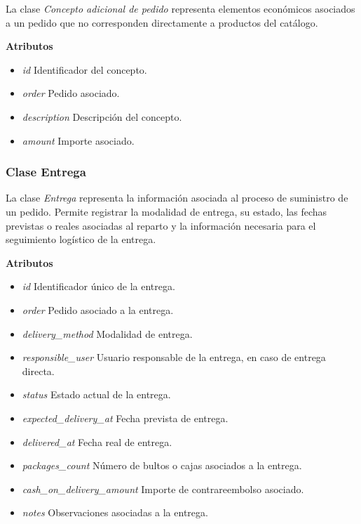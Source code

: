 La clase \textit{Concepto adicional de pedido} representa elementos económicos asociados a un pedido que no corresponden directamente a productos del catálogo.

\textbf{Atributos}

\begin{itemize}

      \item \textit{id}
            Identificador del concepto.
      \item \textit{order}
            Pedido asociado.
      \item \textit{description}
            Descripción del concepto.
      \item \textit{amount}
            Importe asociado.

\end{itemize}

\subsubsection{Clase Entrega}

La clase \textit{Entrega} representa la información asociada al proceso de suministro de un pedido. Permite registrar la modalidad de entrega, su estado, las fechas previstas o reales asociadas al reparto y la información necesaria para el seguimiento logístico de la entrega.

\textbf{Atributos}

\begin{itemize}
      \item \textit{id}
            Identificador único de la entrega.
      \item \textit{order}
            Pedido asociado a la entrega.
      \item \textit{delivery\_method}
            Modalidad de entrega.
      \item \textit{responsible\_user}
            Usuario responsable de la entrega, en caso de entrega directa.
      \item \textit{status}
            Estado actual de la entrega.
      \item \textit{expected\_delivery\_at}
            Fecha prevista de entrega.
      \item \textit{delivered\_at}
            Fecha real de entrega.
      \item \textit{packages\_count}
            Número de bultos o cajas asociados a la entrega.
      \item \textit{cash\_on\_delivery\_amount}
            Importe de contrareembolso asociado.
      \item \textit{notes}
            Observaciones asociadas a la entrega.
\end{itemize}

